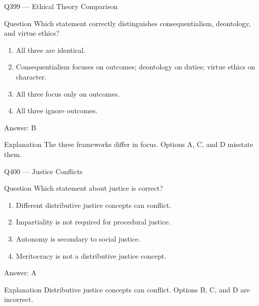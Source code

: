 \documentclass[aspectratio=169,8pt]{beamer}
\begin{document}
	\begin{frame}{Q399 --- Ethical Theory Comparison}
		\begin{block}{Question}
			Which statement correctly distinguishes consequentialism, deontology, and virtue ethics?
			\begin{enumerate}
				\item All three are identical.
				\item Consequentialism focuses on outcomes; deontology on duties; virtue ethics on character.
				\item All three focus only on outcomes.
				\item All three ignore outcomes.
			\end{enumerate}
		\end{block}
		\begin{exampleblock}{Answer: B}\end{exampleblock}
		\begin{block}{Explanation}
			The three frameworks differ in focus. Options A, C, and D misstate them.
		\end{block}
	\end{frame}
	
	\begin{frame}{Q400 --- Justice Conflicts}
		\begin{block}{Question}
			Which statement about justice is correct?
			\begin{enumerate}
				\item Different distributive justice concepts can conflict.
				\item Impartiality is not required for procedural justice.
				\item Autonomy is secondary to social justice.
				\item Meritocracy is not a distributive justice concept.
			\end{enumerate}
		\end{block}
		\begin{exampleblock}{Answer: A}\end{exampleblock}
		\begin{block}{Explanation}
			Distributive justice concepts can conflict. Options B, C, and D are incorrect.
		\end{block}
	\end{frame}
	
	
	
\end{document}
